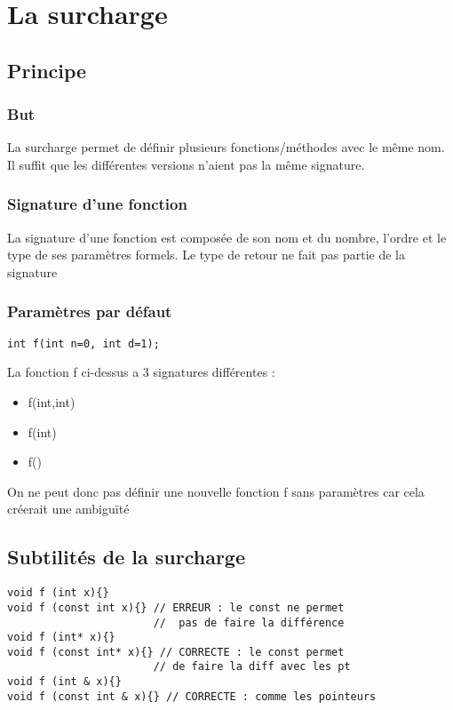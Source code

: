 \documentclass[10pt,a4paper,twoside]{article}
\begin{document}
\section{La surcharge}
\subsection{Principe}
\subsubsection{But}
La surcharge permet de définir plusieurs fonctions/méthodes avec le même nom. Il suffit que les différentes versions n'aient pas la même signature.

\subsubsection{Signature d'une fonction}
La signature d'une fonction est composée de son nom et du nombre, l'ordre et le type de ses paramètres formels. Le type de retour ne fait pas partie de la signature

\subsubsection{Paramètres par défaut}
\begin{verbatim}
int f(int n=0, int d=1);
\end{verbatim}
La fonction f ci-dessus a 3 signatures différentes :
\begin{itemize}
\item f(int,int)
\item f(int)
\item f()
\end{itemize}
On ne peut donc pas définir une nouvelle fonction f sans paramètres car cela créerait une ambiguïté

\subsection{Subtilités de la surcharge}
\begin{verbatim}
void f (int x){}
void f (const int x){} // ERREUR : le const ne permet 
                       //  pas de faire la différence
void f (int* x){}
void f (const int* x){} // CORRECTE : le const permet 
                       // de faire la diff avec les pt
void f (int & x){}
void f (const int & x){} // CORRECTE : comme les pointeurs
\end{verbatim}
\end{document}
